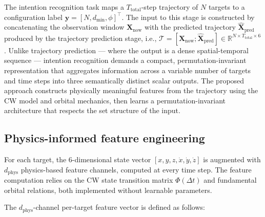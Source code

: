 \documentclass[a4paper,fleqn]{cas-dc}
\newcommand{\biPhi}{\bm{\mathit{\Phi}}} %
\begin{document}
The intention recognition task maps a $T_{\text{total}}$-step trajectory of $N$ targets to a configuration label $\bm{y} = [N, d_{\min}, \phi]^\top$. The input to this stage is constructed by concatenating the observation window $\bm{X}_{\text{now}}$ with the predicted trajectory $\hat{\bm{X}}_{\text{pred}}$ produced by the trajectory prediction stage, i.e., $\mathcal{T} = [\bm{X}_{\text{now}}; \hat{\bm{X}}_{\text{pred}}] \in \mathbb{R}^{N \times T_{\text{total}} \times 6}$. Unlike trajectory prediction --- where the output is a dense spatial-temporal sequence --- intention recognition demands a compact, permutation-invariant representation that aggregates information across a variable number of targets and time steps into three semantically distinct scalar outputs. The proposed approach constructs physically meaningful features from the trajectory using the CW model and orbital mechanics, then learns a permutation-invariant architecture that respects the set structure of the input.

\subsection{Physics-informed feature engineering}

For each target, the 6-dimensional state vector $[x, y, z, \dot{x}, \dot{y}, \dot{z}]$ is augmented with $d_{\text{phys}}$ physics-based feature channels, computed at every time step.%
The feature computation relies on the CW state transition matrix $\biPhi(\Delta t)$ and fundamental orbital relations, both implemented without learnable parameters.

The $d_{\text{phys}}$-channel per-target feature vector is defined as follows:
\end{document}

